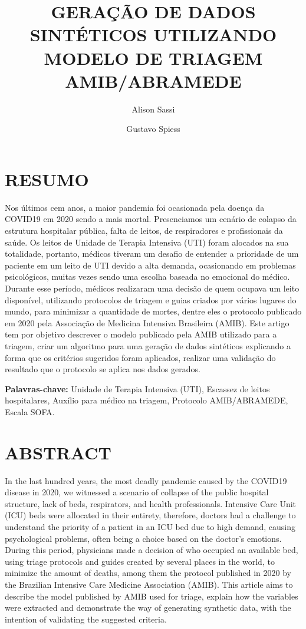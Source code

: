 \documentclass[12pt]{article}
\title{GERAÇÃO DE DADOS SINTÉTICOS UTILIZANDO MODELO DE TRIAGEM AMIB/ABRAMEDE}
\author{Alison Sassi\inst{1} \and Gustavo Spiess\inst{2} }
\begin{document}
\maketitle

\section{RESUMO}

Nos últimos cem anos, a maior pandemia foi ocasionada pela doença da COVID19 em 2020 sendo a mais mortal. Presenciamos um cenário de colapso da estrutura hospitalar pública, falta de leitos, de respiradores e profissionais da saúde. Os leitos de Unidade de Terapia Intensiva (UTI) foram alocados na sua totalidade, portanto, médicos tiveram um desafio de entender a prioridade de um paciente em um leito de UTI devido a alta demanda, ocasionando em problemas psicológicos, muitas vezes sendo uma escolha baseada no emocional do médico. Durante esse período, médicos realizaram uma decisão de quem ocupava um leito disponível, utilizando protocolos de triagem e guias criados por vários lugares do mundo, para minimizar a quantidade de mortes, dentre eles o protocolo publicado em 2020 pela Associação de Medicina Intensiva Brasileira (AMIB). Este artigo tem por objetivo descrever o modelo publicado pela AMIB utilizado para a triagem, criar um algoritmo para uma geração de dados sintéticos explicando a forma que os critérios sugeridos foram aplicados, realizar uma validação do resultado que o protocolo se aplica nos dados gerados.

\textbf{Palavras-chave:} Unidade de Terapia Intensiva (UTI), Escassez de leitos hospitalares, Auxílio para médico na triagem, Protocolo AMIB/ABRAMEDE, Escala SOFA.

\section{ABSTRACT} 

In the last hundred years, the most deadly pandemic caused by the COVID19 disease in 2020, we witnessed a scenario of collapse of the public hospital structure, lack of beds, respirators, and health professionals. Intensive Care Unit (ICU) beds were allocated in their entirety, therefore, doctors had a challenge to understand the priority of a patient in an ICU bed due to high demand, causing psychological problems, often being a choice based on the doctor's emotions. During this period, physicians made a decision of who occupied an available bed, using triage protocols and guides created by several places in the world, to minimize the amount of deaths, among them the protocol published in 2020 by the Brazilian Intensive Care Medicine Association (AMIB). This article aims to describe the model published by AMIB used for triage, explain how the variables were extracted and demonstrate the way of generating synthetic data, with the intention of validating the suggested criteria.
\end{document}
